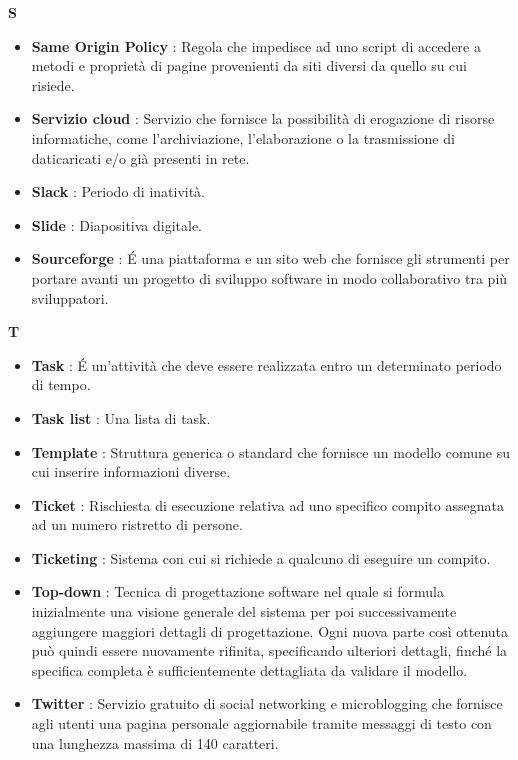 \newpage
{\huge \textbf{S}}
\begin{flushleft}
\begin{itemize}[label={}]
\item \textbf{Same Origin Policy} : Regola che impedisce ad uno script di accedere a metodi e proprietà di pagine provenienti da siti diversi da quello su cui risiede.
\item \textbf{Servizio cloud} : Servizio che fornisce la possibilità di erogazione di risorse informatiche, come l'archiviazione, l'elaborazione o la trasmissione di daticaricati e/o già presenti in rete.
\item \textbf{Slack} : Periodo di inatività.
\item \textbf{Slide} : Diapositiva digitale.
\item \textbf{Sourceforge} : \'E una piattaforma e un sito web che fornisce gli strumenti per portare avanti un progetto di sviluppo software in modo collaborativo tra più sviluppatori.
\end{itemize}
\end{flushleft}
\newpage
{\huge \textbf{T}}
\begin{flushleft}
\begin{itemize}[label={}]
\item \textbf{Task} : \'E un'attività che deve essere realizzata entro un determinato periodo di tempo.
\item \textbf{Task list} : Una lista di task.
\item \textbf{Template} : Struttura generica o standard che fornisce un modello comune su cui inserire informazioni diverse.
\item \textbf{Ticket} : Rischiesta di esecuzione relativa ad uno specifico compito assegnata ad un numero ristretto di persone.
\item \textbf{Ticketing} : Sistema con cui si richiede a qualcuno di eseguire un compito.
\item \textbf{Top-down} : Tecnica di progettazione software nel quale si formula inizialmente una visione generale del sistema per poi successivamente aggiungere maggiori dettagli di progettazione. Ogni nuova parte così ottenuta può quindi essere nuovamente rifinita, specificando ulteriori dettagli, finché la specifica completa è sufficientemente dettagliata da validare il modello.
\item \textbf{Twitter} : Servizio gratuito di social networking e microblogging che fornisce agli utenti una pagina personale aggiornabile tramite messaggi di testo con una lunghezza massima di 140 caratteri.
\end{itemize}
\end{flushleft}

